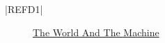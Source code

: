 \begin{center}
    \begin{description}
        \item [|REFD1|] \href{http://mcs.open.ac.uk/mj665/icse17kn.pdf}{The World And The Machine}
    \end{description}
\end{center}